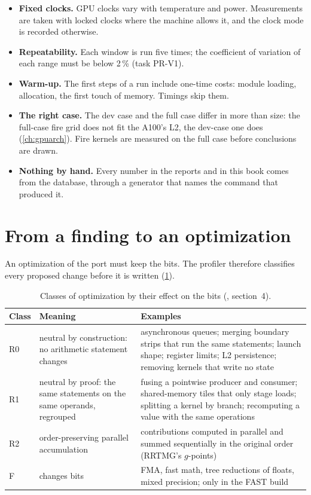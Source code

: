 \begin{itemize}
  \item \textbf{Fixed clocks.} GPU clocks vary with temperature and power. Measurements are taken with locked clocks
    where the machine allows it, and the clock mode is recorded otherwise.
  \item \textbf{Repeatability.} Each window is run five times; the coefficient of variation of each range must be
    below 2\,\% (task PR-V1).
  \item \textbf{Warm-up.} The first steps of a run include one-time costs: module loading, allocation, the first
    touch of memory. Timings skip them.
  \item \textbf{The right case.} The dev case and the full case differ in more than size: the full-case fire grid does
    not fit the A100's L2, the dev-case one does (\cref{ch:gpuarch}). Fire kernels are measured on the full case
    before conclusions are drawn.
  \item \textbf{Nothing by hand.} Every number in the reports and in this book comes from the database, through a
    generator that names the command that produced it.
\end{itemize}

\section{From a finding to an optimization}

An optimization of the port must keep the bits. The profiler therefore classifies every proposed change before it is
written (\cref{tab:bitclass}).

\begin{table}[ht]
\centering
\small
\begin{tabular}{lp{}p{}}
\toprule
Class & Meaning & Examples \\
\midrule
R0 & neutral by construction: no arithmetic statement changes & asynchronous queues; merging boundary strips that run
  the same statements; launch shape; register limits; L2 persistence; removing kernels that write no state \\
R1 & neutral by proof: the same statements on the same operands, regrouped & fusing a pointwise producer and
  consumer; shared-memory tiles that only stage loads; splitting a kernel by branch; recomputing a value with the same
  operations \\
R2 & order-preserving parallel accumulation & contributions computed in parallel and summed sequentially in the
  original order (RRTMG's $g$-points) \\
F & changes bits & FMA, fast math, tree reductions of floats, mixed precision; only in the FAST build \\
\bottomrule
\end{tabular}
\caption{Classes of optimization by their effect on the bits (, section~4).}
\label{tab:bitclass}
\end{table}

